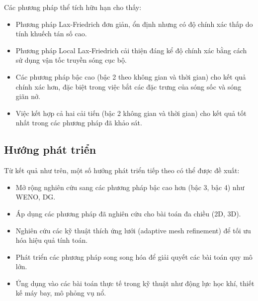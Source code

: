 Các phương pháp thể tích hữu hạn cho thấy:

\begin{itemize}
    \item Phương pháp Lax-Friedrich đơn giản, ổn định nhưng có độ chính xác thấp do tính khuếch tán số cao.
    
    \item Phương pháp Local Lax-Friedrich cải thiện đáng kể độ chính xác bằng cách sử dụng vận tốc truyền sóng cục bộ.
    
    \item Các phương pháp bậc cao (bậc 2 theo không gian và thời gian) cho kết quả chính xác hơn, đặc biệt trong việc bắt các đặc trưng của sóng sốc và sóng giãn nở.
    
    \item Việc kết hợp cả hai cải tiến (bậc 2 không gian và thời gian) cho kết quả tốt nhất trong các phương pháp đã khảo sát.
\end{itemize}

\subsection{Hướng phát triển}

Từ kết quả như trên, một số hướng phát triển tiếp theo có thể được đề xuất:

\begin{itemize}
    \item Mở rộng nghiên cứu sang các phương pháp bậc cao hơn (bậc 3, bậc 4) như WENO, DG.
    
    \item Áp dụng các phương pháp đã nghiên cứu cho bài toán đa chiều (2D, 3D).
    
    \item Nghiên cứu các kỹ thuật thích ứng lưới (adaptive mesh refinement) để tối ưu hóa hiệu quả tính toán.
    
    \item Phát triển các phương pháp song song hóa để giải quyết các bài toán quy mô lớn.
    
    \item Ứng dụng vào các bài toán thực tế trong kỹ thuật như động lực học khí, thiết kế máy bay, mô phỏng vụ nổ.
\end{itemize}
